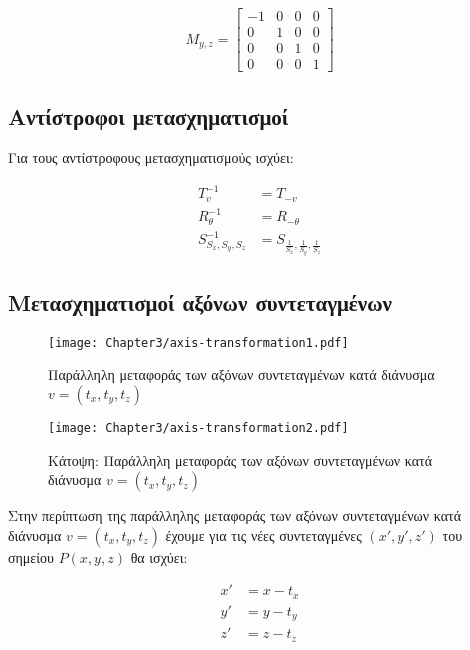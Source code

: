\[
M_{y, z} = 
\begin{bmatrix}
-1 & 0 & 0 & 0 \\
0 & 1 & 0 & 0 \\
0 & 0 & 1 & 0 \\
0 & 0 & 0 & 1
\end{bmatrix}
\]



\subsection{Αντίστροφοι μετασχηματισμοί}

Για τους αντίστροφους μετασχηματισμούς ισχύει:

\begin{align*}
	T^{-1}_{v} &= T_{-v}\\
	R^{-1}_{\theta} &= R_{-\theta}\\
	S^{-1}_{S_x,S_y,S_z} &= S_{\frac{1}{S_x}, \frac{1}{S_y}, \frac{1}{S_z}}
\end{align*}

\subsection{Μετασχηματισμοί αξόνων συντεταγμένων}

\begin{figure}[hbt]
  \begin{center}
	\texttt{[image: Chapter3/axis-transformation1.pdf]}
  \end{center}
  \caption{Παράλληλη μεταφοράς των αξόνων συντεταγμένων κατά διάνυσμα \( v = (t_x, t_y, t_z) \)}
\end{figure}

\begin{figure}[hbt]
  \begin{center}
	\texttt{[image: Chapter3/axis-transformation2.pdf]}
  \end{center}
  \caption{Κάτοψη: Παράλληλη μεταφοράς των αξόνων συντεταγμένων κατά διάνυσμα \( v = (t_x, t_y, t_z) \)}
\end{figure}

Στην περίπτωση της παράλληλης μεταφοράς των αξόνων συντεταγμένων κατά διάνυσμα \( v = (t_x, t_y, t_z) \) έχουμε για τις νέες συντεταγμένες \( (x', y', z') \) του σημείου \( P(x, y, z) \) θα ισχύει:

\begin{align*}
	x' &= x - t_x \\ 
	y' &= y - t_y \\
	z' &= z - t_z
\end{align*}


